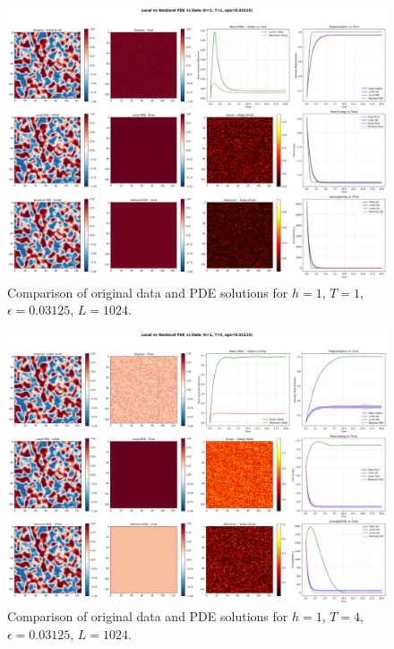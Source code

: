 \documentclass[11pt,a4paper]{article}
\begin{document}
\begin{figure}[!h]
    \centering
    \includegraphics[width=1.0\textwidth]{fig/compare_local_nonlocal_L1024_h1_T1_eps0.03125.png}
    \caption{Comparison of original data and PDE solutions for $h=1$, $T=1$, $\epsilon=0.03125$, $L=1024$.}
    \label{fig:pde_comparison_h1_T1_eps0.03125}
\end{figure}


\begin{figure}[h]
    \centering
    \includegraphics[width=1.0\textwidth]{fig/compare_local_nonlocal_L1024_h1_T4_eps0.03125.png}
    \caption{Comparison of original data and PDE solutions for $h=1$, $T=4$, $\epsilon=0.03125$, $L=1024$.}
    \label{fig:pde_comparison_h1_T4_eps0.03125}
\end{figure}
\end{document}
